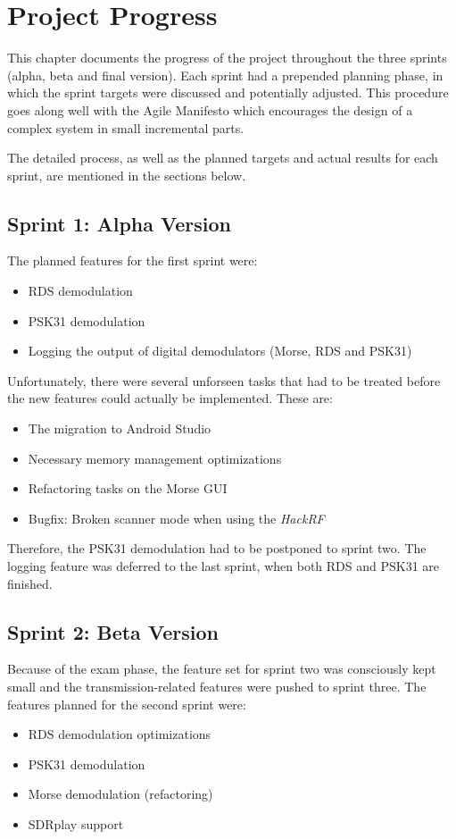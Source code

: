 \chapter{Project Progress\label{ch:project_progress}}

This chapter documents the progress of the project throughout the three
sprints (alpha, beta and final version). Each sprint had a pre\-pen\-ded
planning phase, in which the sprint targets were discussed and potentially
adjusted. This procedure goes along well with the Agile Manifesto which
encourages the design of a complex system in small incremental parts.

The detailed process, as well as the planned targets and actual
results for each sprint, are mentioned in the sections below.

\section{Sprint 1: Alpha Version}

The planned features for the first sprint were:
\begin{itemize}
	\item RDS demodulation
	\item PSK31 demodulation
	\item Logging the output of digital demodulators (Morse, RDS and PSK31)
\end{itemize}

Unfortunately, there were several unforseen tasks that had to be treated
before the new features could actually be implemented. These are:
\begin{itemize}
	\item The migration to Android Studio
	\item Necessary memory management optimizations
	\item Refactoring tasks on the Morse \ac{GUI}
	\item Bugfix: Broken scanner mode when using the \emph{HackRF}
\end{itemize}

Therefore, the PSK31 demodulation had to be postponed to sprint two. The
logging feature was deferred to the last sprint, when both RDS and
PSK31 are finished.


\section{Sprint 2: Beta Version}

Because of the exam phase, the feature set for sprint two was consciously
kept small and the transmission-related features were pushed to sprint
three. The features planned for the second sprint were:
\begin{itemize}
	\item RDS demodulation optimizations
	\item PSK31 demodulation
	\item Morse demodulation (refactoring)
	\item SDRplay support
\end{itemize}

